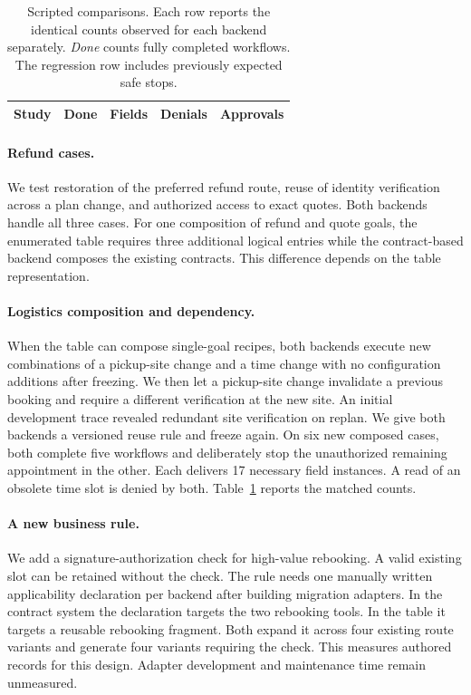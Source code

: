 \begin{table}[t]
\centering
\small
\setlength{\tabcolsep}{2.2pt}
\begin{tabular}{@{}lrrrr@{}}
\toprule
Study & Done & Fields & Denials & Approvals \\
\midrule

\end{tabular}
\caption{Scripted comparisons. Each row reports the identical counts observed for each backend separately. \emph{Done} counts fully completed workflows. The regression row includes previously expected safe stops.}
\label{tab:scripted}
\end{table}

\paragraph{Refund cases.}
We test restoration of the preferred refund route, reuse of identity verification across a plan change, and authorized access to exact quotes. Both backends handle all three cases. For one composition of refund and quote goals, the enumerated table requires three additional logical entries while the contract-based backend composes the existing contracts. This difference depends on the table representation.

\paragraph{Logistics composition and dependency.}
When the table can compose single-goal recipes, both backends execute new combinations of a pickup-site change and a time change with no configuration additions after freezing. We then let a pickup-site change invalidate a previous booking and require a different verification at the new site. An initial development trace revealed redundant site verification on replan. We give both backends a versioned reuse rule and freeze again. On six new composed cases, both complete five workflows and deliberately stop the unauthorized remaining appointment in the other. Each delivers 17 necessary field instances. A read of an obsolete time slot is denied by both. Table~\ref{tab:scripted} reports the matched counts.

\paragraph{A new business rule.}
We add a signature-authorization check for high-value rebooking. A valid existing slot can be retained without the check. The rule needs one manually written applicability declaration per backend after building migration adapters. In the contract system the declaration targets the two rebooking tools. In the table it targets a reusable rebooking fragment. Both expand it across four existing route variants and generate four variants requiring the check. This measures authored records for this design. Adapter development and maintenance time remain unmeasured.

